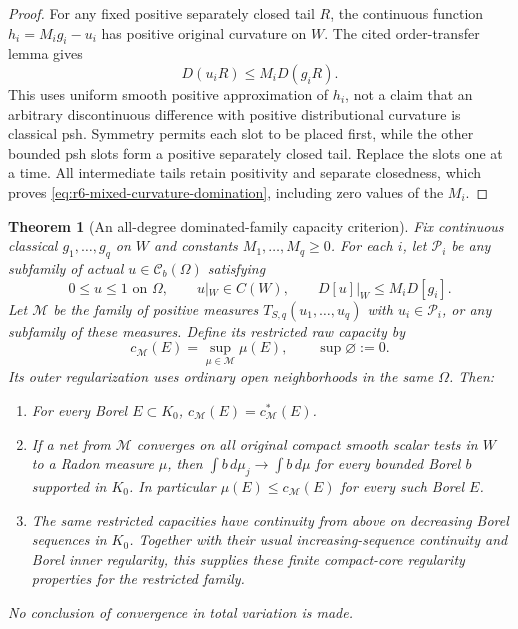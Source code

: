 \documentclass[11pt,a4paper]{article}
\numberwithin{equation}{section}
\newtheorem{theorem}{Theorem}[section]
\theoremstyle{definition}
\theoremstyle{remark}
\begin{document}
\begin{proof}
For any fixed positive separately closed tail $R$, the continuous
function $h_i=M_i g_i-u_i$ has positive original curvature on $W$.
The cited order-transfer lemma gives
\[
                       D(u_iR)\le M_iD(g_iR).
\]
This uses uniform smooth positive approximation of $h_i$, not a
claim that an arbitrary discontinuous difference with positive
distributional curvature is classical psh. Symmetry permits each
slot to be placed first, while the other bounded psh slots form a
positive separately closed tail. Replace the slots one at a time.
All intermediate tails retain positivity and separate closedness,
which proves \eqref{eq:r6-mixed-curvature-domination}, including
zero values of the $M_i$.
\end{proof}

\begin{theorem}[An all-degree dominated-family capacity criterion]
\label{thm:r6-dominated-curvature-capacity}
Fix continuous classical $g_1,\ldots,g_q$ on $W$ and constants
$M_1,\ldots,M_q\ge0$. For each $i$, let $\mathscr P_i$ be any
subfamily of actual $u\in\mathcal C_b(\Omega)$ satisfying
\[
 0\le u\le1\text{ on }\Omega,\qquad u|_W\in C(W),\qquad
                              D[u]|_W\le M_iD[g_i].
\]
Let $\mathscr M$ be the family of positive measures
$T_{S,q}(u_1,\ldots,u_q)$ with $u_i\in\mathscr P_i$, or any
subfamily of these measures. Define its restricted raw capacity by
\[
             c_{\mathscr M}(E)=\sup_{\mu\in\mathscr M}\mu(E),
             \qquad\sup\varnothing:=0.
\]
Its outer regularization uses ordinary open neighborhoods in the
same $\Omega$. Then:
\begin{enumerate}
\item For every Borel $E\subset K_0$,
      $c_{\mathscr M}(E)=c_{\mathscr M}^*(E)$.
\item If a net from $\mathscr M$ converges on all original compact
      smooth scalar tests in $W$ to a Radon measure $\mu$, then
      $\int b\,d\mu_j\to\int b\,d\mu$ for every bounded Borel
      $b$ supported in $K_0$. In particular
      $\mu(E)\le c_{\mathscr M}(E)$ for every such Borel $E$.
\item The same restricted capacities have continuity from above on
      decreasing Borel sequences in $K_0$. Together with their
      usual increasing-sequence continuity and Borel inner
      regularity, this supplies these finite compact-core regularity
      properties for the restricted family.
\end{enumerate}
No conclusion of convergence in total variation is made.
\end{theorem}
\end{document}
